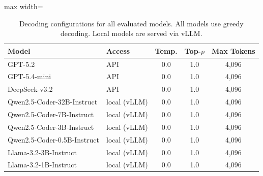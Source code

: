 \begin{table}[t]
\centering
\small
\begin{adjustbox}{max width=\columnwidth}
\begin{tabular}{llccc}
\toprule
\textbf{Model} & \textbf{Access} & \textbf{Temp.} & \textbf{Top-$p$} & \textbf{Max Tokens} \\
\midrule
GPT-5.2 & API & 0.0 & 1.0 & 4,096 \\
GPT-5.4-mini & API & 0.0 & 1.0 & 4,096 \\
\midrule
DeepSeek-v3.2 & API & 0.0 & 1.0 & 4,096 \\
Qwen2.5-Coder-32B-Instruct & local (vLLM) & 0.0 & 1.0 & 4,096 \\
Qwen2.5-Coder-7B-Instruct & local (vLLM) & 0.0 & 1.0 & 4,096 \\
Qwen2.5-Coder-3B-Instruct & local (vLLM) & 0.0 & 1.0 & 4,096 \\
Qwen2.5-Coder-0.5B-Instruct & local (vLLM) & 0.0 & 1.0 & 4,096 \\
Llama-3.2-3B-Instruct & local (vLLM) & 0.0 & 1.0 & 4,096 \\
Llama-3.2-1B-Instruct & local (vLLM) & 0.0 & 1.0 & 4,096 \\
\bottomrule
\end{tabular}
\end{adjustbox}
\caption{Decoding configurations for all evaluated models. All models use greedy decoding. Local models are served via vLLM.}
\label{app:model_decoding_config}
\end{table}